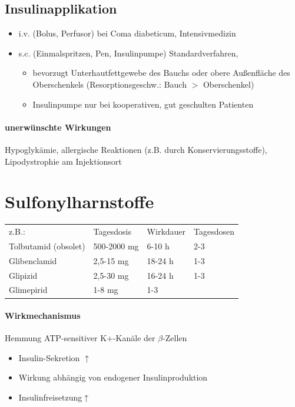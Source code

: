 \documentclass[10pt,a4paper]{report}
\begin{document}
\subsection{Insulinapplikation} %
\label{ssub:insulinapplikation}
\begin{itemize}
	\item i.v.	(Bolus, Perfusor) bei Coma diabeticum, Intensivmedizin
	\item s.c.	(Einmalspritzen, Pen, Insulinpumpe) Standardverfahren,
	\begin{itemize}
		\item bevorzugt Unterhautfettgewebe des Bauchs oder obere Außenfläche des Oberschenkels (Resorptionsgeschw.: Bauch $>$ Oberschenkel)
		\item Insulinpumpe nur bei kooperativen, gut geschulten Patienten
	\end{itemize}
\end{itemize}
\paragraph{unerwünschte Wirkungen} %
\label{subp:unerw_nschte_wirkungen}
Hypoglykämie, allergische Reaktionen (z.B. durch Konservierungsstoffe), Lipodystrophie am Injektionsort
\section{Sulfonylharnstoffe} %
\label{sec:sulfonylharnstoffe}
\begin{tabularx}{\textwidth}{XXXX}
z.B.:&Tagesdosis&Wirkdauer&Tagesdosen\\
Tolbutamid (obsolet)&500-2000 mg&6-10 h&2-3\\
Glibenclamid&2,5-15 mg&18-24 h&1-3\\
Glipizid&2,5-30 mg&16-24 h&1-3\\
Glimepirid&1-8 mg&1-3\\
\end{tabularx}
\paragraph{Wirkmechanismus} %
\label{subp:wirkmechanismus}
Hemmung ATP-sensitiver K+-Kanäle der $\beta$-Zellen
\begin{itemize}
	\item Insulin-Sekretion $\uparrow$
	\item Wirkung abhängig von endogener Insulinproduktion
	\item Insulinfreisetzung$\uparrow$
\end{itemize}
\end{document}

